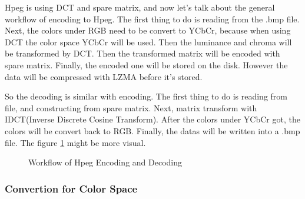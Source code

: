\documentclass{article}
\begin{document}
Hpeg is using DCT and spare matrix, and now let's talk about the general workflow of encoding to Hpeg. The first thing to do is reading from the .bmp file.
Next, the colors under RGB need to be convert to YCbCr, because when using DCT the color space YCbCr will be used. 
Then the luminance and chroma will be transformed by DCT. Then the transformed matrix will be encoded with spare matrix.
Finally, the encoded one will be stored on the disk. However the data will be compressed with LZMA before it's stored.

So the decoding is similar with encoding. The first thing to do is reading from file, and constructing from spare matrix.
Next, matrix transform with IDCT(Inverse Discrete Cosine Transform). After the colors under YCbCr got, the colors will be convert
back to RGB. Finally, the datas will be written into a .bmp file. The figure \ref{fig:hpeg:workflow} might be more visual.

\begin{figure}
    \centering
    \caption{Workflow of Hpeg Encoding and Decoding}
    \label{fig:hpeg:workflow}
\end{figure}

\subsubsection{Convertion for Color Space}
\label{sec:hpeg:inside:cfcs}
\end{document}
